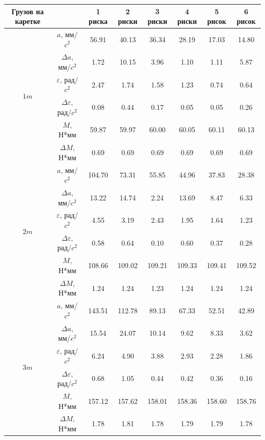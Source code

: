 \documentclass[12pt, a4paper]{article}
\begin{document}
\begin{table}[h!]
\begin{center}
\begin{tabular}{|c|c|c|c|c|c|c|c|}
\hline
Грузов на каретке & & 1 риска & 2 риски & 3 риски & 4 риски & 5 рисок & 6 рисок \\
\hline
\multirow{6}{*}{$1 m $} & $a$, мм/$c^2$ &56.91 & 40.13 & 36.34 & 28.19 & 17.03 & 14.80\\[5pt] 
\cline{2-8} 
&$\Delta a$, мм/$c^2$&1.72 & 10.15 & 3.96 & 1.10 & 1.11 & 5.87\\[5pt] 
\cline{2-8} 
& $\varepsilon$, рад/$c^2$ &2.47 & 1.74 & 1.58 & 1.23 & 0.74 & 0.64\\[5pt] 
\cline{2-8} 
&$\Delta \varepsilon$, рад/$c^2$ &0.08 & 0.44 & 0.17 & 0.05 & 0.05 & 0.26\\[5pt] 
\cline{2-8} 
&$M$, Н*мм &59.87 & 59.97 & 60.00 & 60.05 & 60.11 & 60.13\\[5pt] 
\cline{2-8} 
&$\Delta M$, Н*мм &0.69 & 0.69 & 0.69 & 0.69 & 0.69 & 0.69\\[5pt] 
\cline{2-8} 
\hline 
\multirow{6}{*}{$2 m $} & $a$, мм/$c^2$ &104.70 & 73.31 & 55.85 & 44.96 & 37.83 & 28.38\\[5pt] 
\cline{2-8} 
&$\Delta a$, мм/$c^2$&13.22 & 14.74 & 2.24 & 13.69 & 8.47 & 6.33\\[5pt] 
\cline{2-8} 
& $\varepsilon$, рад/$c^2$ &4.55 & 3.19 & 2.43 & 1.95 & 1.64 & 1.23\\[5pt] 
\cline{2-8} 
&$\Delta \varepsilon$, рад/$c^2$ &0.58 & 0.64 & 0.10 & 0.60 & 0.37 & 0.28\\[5pt] 
\cline{2-8} 
&$M$, Н*мм &108.66 & 109.02 & 109.21 & 109.33 & 109.41 & 109.52\\[5pt] 
\cline{2-8} 
&$\Delta M$, Н*мм &1.24 & 1.24 & 1.23 & 1.24 & 1.24 & 1.24\\[5pt] 
\cline{2-8} 
\hline 
\multirow{6}{*}{$3 m $} & $a$, мм/$c^2$ &143.51 & 112.78 & 89.13 & 67.33 & 52.51 & 42.89\\[5pt] 
\cline{2-8} 
&$\Delta a$, мм/$c^2$&15.54 & 24.07 & 10.14 & 9.62 & 8.33 & 3.62\\[5pt] 
\cline{2-8} 
& $\varepsilon$, рад/$c^2$ &6.24 & 4.90 & 3.88 & 2.93 & 2.28 & 1.86\\[5pt] 
\cline{2-8} 
&$\Delta \varepsilon$, рад/$c^2$ &0.68 & 1.05 & 0.44 & 0.42 & 0.36 & 0.16\\[5pt] 
\cline{2-8} 
&$M$, Н*мм &157.12 & 157.62 & 158.01 & 158.36 & 158.60 & 158.76\\[5pt] 
\cline{2-8} 
&$\Delta M$, Н*мм &1.78 & 1.81 & 1.78 & 1.79 & 1.79 & 1.78\\[5pt] 

\end{tabular}
\end{center}
\end{table}
\end{document}
